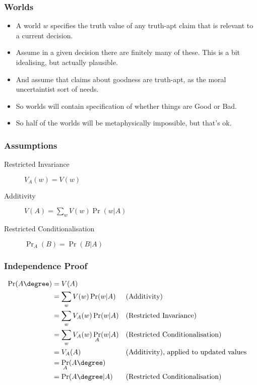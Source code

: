 \begin{frame}[fragile]
\frametitle{Worlds}
\label{worlds}

\begin{itemize}
\item{} A world $w$ specifies the truth value of any truth-apt claim that is relevant to a current decision.

\item{} Assume in a given decision there are finitely many of these. This is a bit idealising, but actually plausible.

\item{} And assume that claims about goodness are truth-apt, as the moral uncertaintist sort of needs.

\item{} So worlds will contain specification of whether things are Good or Bad.

\item{} So half of the worlds will be metaphysically impossible, but that's ok.

\end{itemize}

\end{frame}

\begin{frame}[fragile]
\frametitle{Assumptions}
\label{assumptions}

\begin{description}
\item[Restricted Invariance]

$V_A(w) = V(w)$

\item[Additivity]

$V(A) = \sum_w V(w)\Pr(w | A)$

\item[Restricted Conditionalisation]

$\Pr_A(B) = \Pr(B | A)$
\end{description}

\end{frame}

\begin{frame}[fragile]
\frametitle{Independence Proof}
\label{independenceproof}

\begin{align*}
\Pr(A\degree) &= V(A) \\
        &= \sum_w V(w) \Pr(w | A) && \text{(Additivity)} \\
        &= \sum_w V_A(w) \Pr(w | A) && \text{(Restricted Invariance)} \\
        &= \sum_w V_A(w) \Pr_A(w | A) && \text{(Restricted Conditionalisation)} \\
        &= V_A(A) && \text{(Additivity), applied to updated values} \\
        &= \Pr_A(A\degree) \\
        &= \Pr(A\degree | A) && \text{(Restricted Conditionalisation)} 
\end{align*}


\end{frame}

